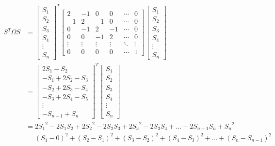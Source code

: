 \documentclass[
]{article}
\begin{document}
\begin{align*}
  S^T \Omega S &= 
  \begin{bmatrix} 
    S_1 \\
    S_2 \\
    S_3 \\
    S_4 \\
    \vdots \\
    S_n
  \end{bmatrix}^T
  \begin{bmatrix} 
    2 & -1 & 0 & 0 & \cdots & 0 \\
    -1 & 2 & -1 & 0 & \cdots & 0 \\
    0 & -1 & 2 & -1 & \cdots & 0 \\
    0 & 0 & -1 & 2 & \cdots & 0 \\
    \vdots & \vdots & \vdots & \vdots & \ddots & \vdots \\
    0 & 0 & 0 & 0 & \cdots & 1
  \end{bmatrix}
  \begin{bmatrix} 
    S_1 \\
    S_2 \\
    S_3 \\
    S_4 \\
    \vdots \\
    S_n
  \end{bmatrix} \\
  &= 
  \begin{bmatrix} 
    2 S_1 - S_2 \\
    -S_1 + 2 S_2 - S_3 \\
    -S_2 + 2 S_3 -S_4 \\
    -S_3 + 2 S_4 - S_5 \\
    \vdots \\
    -S_{n-1} + S_n
  \end{bmatrix}^T
  \begin{bmatrix} 
    S_1 \\
    S_2 \\
    S_3 \\
    S_4 \\
    \vdots \\
    S_n
  \end{bmatrix} \\
  &=
  2 {S_1}^2 - 2 S_1 S_2 + 2 {S_2}^2 - 2 S_2 S_3 + 2 {S_3}^2 - 2 S_3 S_4 + \dots - 2 S_{n-1} S_n + {S_n}^2 \\
  &= (S_1 - 0)^2 + (S_2 - S_1)^2 + (S_3 - S_2)^2 + (S_4 - S_3)^2 + \dots + (S_n - S_{n-1})^2 \label{eq:omega-simplification}
\end{align*}
\end{document}
